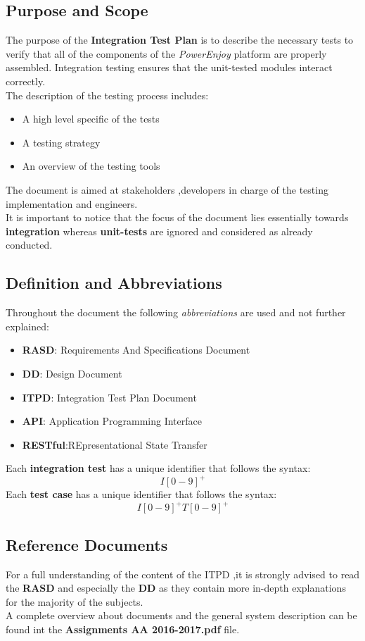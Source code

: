 \subsection{Purpose and Scope}
The purpose of the \textbf{Integration Test Plan} is to describe the necessary tests to verify that all of the components of the \emph{PowerEnjoy} platform are properly assembled. Integration testing ensures that the unit-tested modules interact correctly.\\
The description of the testing process includes:
\begin{itemize}
\item A high level specific of the tests
\item A testing strategy
\item An overview of the testing tools
\end{itemize}
The document is aimed at stakeholders ,developers in charge of the testing implementation and engineers.\\
It is important to notice that the focus of the document lies essentially towards \textbf{integration} whereas \textbf{unit-tests} are ignored and considered as already conducted. 
\subsection{Definition and Abbreviations}
Throughout the document the following \textit{abbreviations} are used and not further explained:
\begin{itemize}
\item \textbf{RASD}: Requirements And Specifications Document
\item \textbf{DD}: Design Document
\item \textbf{ITPD}: Integration Test Plan Document
\item \textbf{API}: Application Programming Interface
\item \textbf{RESTful}:REpresentational State Transfer
\end{itemize}
Each \textbf{integration test} has a unique identifier that follows the syntax: $$ I[0-9]^+$$
Each \textbf{test case} has a unique identifier that follows the syntax: $$I[0-9]^+T[0-9]^+$$
 
\subsection{Reference Documents}
For a full understanding of the content of the ITPD ,it is strongly advised to read the \textbf{RASD} and especially the \textbf{DD} as they contain more in-depth explanations for the majority of the subjects.\\
A complete overview about documents and the general system description can be found int the \textbf{Assignments AA 2016-2017.pdf} file.



